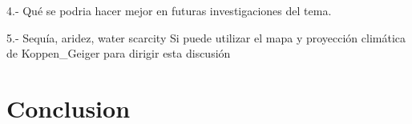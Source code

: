 \documentclass[
  authoryear,
  preprint,
  3p,
  onecolumn]{elsarticle}
\begin{document}
4.- Qué se podria hacer mejor en futuras investigaciones del tema.

5.- Sequía, aridez, water scarcity \citep{VanLoon2013} Si puede utilizar
el mapa y proyección climática de Koppen\_Geiger \citep{Beck2023} para
dirigir esta discusión

\hypertarget{conclusion}{%
\section{Conclusion}\label{conclusion}}

\newpage


\renewcommand\refname{References}
  
\end{document}
